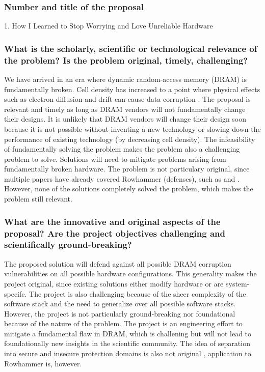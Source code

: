 \subsubsection*{Number and title of the proposal}
1. How I Learned to Stop Worrying and Love Unreliable Hardware

\subsubsection*{What is the scholarly, scientific or technological relevance of the problem? Is the problem original, timely, challenging?}
We have arrived in an era where dynamic random-access memory (DRAM) is fundamentally broken. Cell density has increased to a point where physical effects such as electron diffusion and drift can cause data corruption \cite{dram_physics}. The proposal is relevant and timely as long as DRAM vendors will not fundamentally change their designs. It is unlikely that DRAM vendors will change their design soon because it is not possible without inventing a new technology or slowing down the performance of existing technology (by decreasing cell density). The infeasibility of fundamentally solving the problem makes the problem also a challenging problem to solve. Solutions will need to mitigate problems arising from fundamentally broken hardware. The problem is not particulary original, since multiple papers have already covered Rowhammer (defenses), such as \cite{brasser2016cant} and \cite{van2016drammer}. However, none of the solutions completely solved the problem, which makes the problem still relevant.

\subsubsection*{What are the innovative and original aspects of the proposal? Are the project objectives challenging and scientifically ground-breaking?}
The proposed solution will defend against all possible DRAM corruption vulnerabilities on all possible hardware configurations. This generality makes the project original, since existing solutions either modify hardware or are system-specifc. The project is also challenging because of the sheer complexity of the software stack and the need to generalize over all possible software stacks. However, the project is not particularly ground-breaking nor foundational because of the nature of the problem. The project is an engineering effort to mitigate a fundamental flaw in DRAM, which is challening but will not lead to foundationally new insights in the scientific community. The idea of separation into secure and insecure protection domains is also not original \cite{efficient_protection}, application to Rowhammer is, however.

